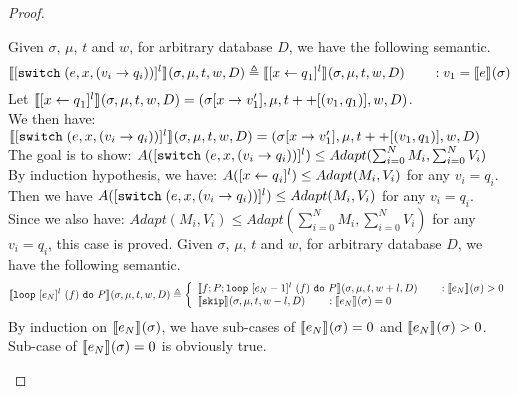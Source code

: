 \documentclass[a4paper,11pt]{article}
\begin{document}
\begin{proof}
\begin{itemize}
%
%
%
%
Given $\sigma$, $\mu$, $t$ and $w$, for arbitrary database $D$, we have the following semantic.
%
%
\[
\llbracket {[\ensuremath{\mathtt{switch}}\;( e, x, (v_i \to  q_i))]^{l}} \rrbracket_{} (\sigma, \mu , t, w , D)  
\triangleq 
\llbracket [\mathrel{ x \leftarrow q }_1]^{l} \rrbracket_{} ( \sigma, \mu , t, w, D ) 
\qquad : v_1 = \llbracket e\rrbracket_{}{(\sigma)}
\]
%
Let $\llbracket[\mathrel{ x \leftarrow q }_1]^{l}\rrbracket_{} (\sigma , \mu, t, w, D) = (\sigma[x \to v_1'] , \mu, t++[(v_1, q_1)], w, D)$.
\\
We then have:
$\llbracket {[\ensuremath{\mathtt{switch}}\;( e, x, (v_i \to  q_i))]^{l}} \rrbracket_{} (\sigma, \mu , t, w , D)  
=(\sigma[x \to v_1'] , \mu, t++[(v_1, q_1)], w, D)
$
\\
The goal is to show:
$A( {[\mathtt{switch}\;( e, x, (v_i \to  q_i))]^{l}}) \leq Adapt(\sum_{i = 0}^{N}M_i, \sum_{i = 0}^{N}V_i)$
\\
By induction hypothesis, we have:
%
$A([\mathrel{ x \leftarrow q }_i]^{l})  \leq Adapt(M_i, V_i)$ for any $v_i = q_i$.
%
\\
Then we have $A( {[\mathtt{switch}\;( e, x, (v_i \to  q_i))]^{l}}) \leq Adapt(M_i, V_i)$ for any $v_i = q_i$.
\\
%
Since we also have: $ Adapt(M_i, V_i) \leq Adapt(\sum_{i = 0}^{N}M_i, \sum_{i = 0}^{N}V_i)$ for any $v_i = q_i$, this case is proved.
%
%
%
Given $\sigma$, $\mu$, $t$ and $w$, for arbitrary database $D$, we have the following semantic.
%
%
\[          
\lrr{ {\eloop ~ [\expr_N]^{l} ~ (f) ~ \edo ~ P } }{} (\sigma, \mu , t, w , D)
\triangleq
\left \{  \begin{array}{l} 
\lrr{f;P; \eloop ~ [\expr_N-1]^{l} ~ (f) ~ \edo ~ P }{} (\sigma , \mu, t, w + l, D) 
\qquad : \lrr{\expr_N}{}(\sigma) >0 \\ 
\lrr{\eskip}{} (\sigma , \mu, t, w-l, D) 
\qquad : \lrr{\expr_N}{}(\sigma) = 0 \end{array} 
\right .
\]
%
By induction on $\llbracket e_N\rrbracket_{}(\sigma)$, we have sub-cases of $\llbracket e_N\rrbracket_{}(\sigma) = 0$ and $\llbracket e_N\rrbracket_{}(\sigma) > 0$.
\\
Sub-case of $\llbracket e_N\rrbracket_{}(\sigma) = 0$ is obviously true.

\end{itemize}
\end{proof}
\end{document}
